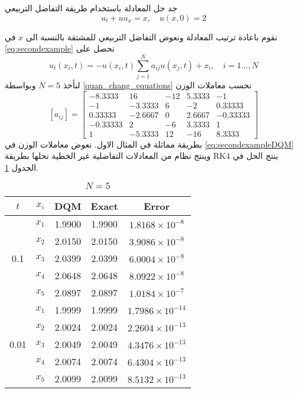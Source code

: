 \begin{example}
	جد حل المعادلة باستخدام طريقة التفاضل التربيعي 
\begin{equation}
	\label{eq:secondexample}
		u_t + u u_x = x, \quad u(x, 0) = 2
\end{equation}
\end{example}
\begin{solution}
	نقوم باعادة  ترتيب المعادلة ونعوض التفاضل التربيعي للمشتقة بالنسبة الى $x$ في \eqref{eq:secondexample} نحصل على 
	\begin{equation}
		\label{eq:secondexampleDQM}
		u_t(x_i, t) = - u(x_i, t) \sum_{j=1}^{N} a_{ij} u(x_j, t) + x_i,\quad i =1\dots,N 
	\end{equation}
	لنأخذ $N=5$ وبواسطة \eqref{quan_chang_equations} نحسب معاملات الوزن 
\[
[a_{ij}] =
\begin{bmatrix}
	-8.3333 & 16 & -12 & 5.3333 & -1 \\
	-1 & -3.3333 & 6 & -2 & 0.33333 \\
	0.33333 & -2.6667 & 0 & 2.6667 & -0.33333 \\
	-0.33333 & 2 & -6 & 3.3333 & 1 \\
	1 & -5.3333 & 12 & -16 & 8.3333
\end{bmatrix}
\]
بطريقة مماثلة في المثال الاول. نعوض معاملات الوزن في \eqref{eq:secondexampleDQM} وينتج نظام من المعادلات التفاضلية غير الخطية نحلها بطريقة RK4 ينتج الحل في الجدول \ref{tab:secondexN5}.

	\begin{table}[h!]
	\centering
	\begin{english}
	\begin{tabular}{|c|c|c|c|c|}
		\hline
		$t$ & $x_i$ & DQM & Exact & Error \\
		\hline
		\multirow{5}{*}{0.1} & $x_1$ & 1.9900 & 1.9900 & $1.8168 \times 10^{-8}$ \\
		& $x_2$ & 2.0150 & 2.0150 & $3.9086 \times 10^{-8}$ \\
		& $x_3$ & 2.0399 & 2.0399 & $6.0004 \times 10^{-8}$ \\
		& $x_4$ & 2.0648 & 2.0648 & $8.0922 \times 10^{-8}$ \\
		& $x_5$ & 2.0897 & 2.0897 & $1.0184 \times 10^{-7}$ \\
		\hline
		\multirow{5}{*}{0.01} & $x_1$ & 1.9999 & 1.9999 & $1.7986 \times 10^{-14}$ \\
		& $x_2$ & 2.0024 & 2.0024 & $2.2604 \times 10^{-13}$ \\
		& $x_3$ & 2.0049 & 2.0049 & $4.3476 \times 10^{-13}$ \\
		& $x_4$ & 2.0074 & 2.0074 & $6.4304 \times 10^{-13}$ \\
		& $x_5$ & 2.0099 & 2.0099 & $8.5132 \times 10^{-13}$ \\
		\hline
	\end{tabular}
\end{english}
	\caption{$N=5$}
	\label{tab:secondexN5}
\end{table}



\end{solution}

